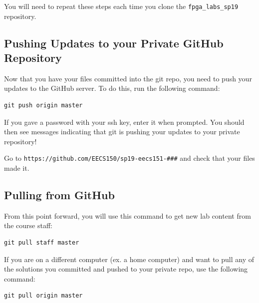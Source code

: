 \documentclass[11pt]{article}
\begin{document}
You will need to repeat these steps each time you clone the \verb|fpga_labs_sp19| repository.

\subsection{Pushing Updates to your Private GitHub Repository}
Now that you have your files committed into the git repo, you need to push your updates to the GitHub server.  To do this, run the following command:
\begin{verbatim}
git push origin master
\end{verbatim}

If you gave a password with your ssh key, enter it when prompted.  You should then see messages indicating that git is pushing your updates to your private repository!

Go to \verb|https://github.com/EECS150/sp19-eecs151-###| and check that your files made it.

\subsection{Pulling from GitHub}
From this point forward, you will use this command to get new lab content from the course staff:
\begin{verbatim}
git pull staff master
\end{verbatim}

If you are on a different computer (ex. a home computer) and want to pull any of the solutions you committed and pushed to your private repo, use the following command:
\begin{verbatim}
git pull origin master
\end{verbatim}
\end{document}
